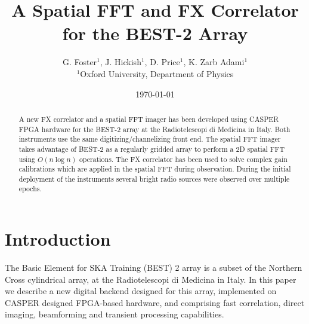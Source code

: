 \documentclass[useAMS,macros,usenatbib,onecolumn]{mn2e}
\title[]{A Spatial FFT and FX Correlator for the BEST-2 Array}
\author[G. Foster, J. Hickish, D. Price and K. Zarb Adami]{G. Foster$^{1}$, J. Hickish$^{1}$, D. Price$^{1}$, K. Zarb Adami$^{1}$\\
$^{1}$Oxford University, Department of Physics}
\begin{document}
\date{\today}

\pagerange{\pageref{firstpage}--\pageref{lastpage}} 

\maketitle

\begin{abstract}
A new FX correlator and a spatial FFT imager has been developed using CASPER FPGA hardware for the BEST-2 array at the Radiotelescopi di Medicina in Italy.
Both instruments use the same digitizing/channelizing front end.
The spatial FFT imager takes advantage of BEST-2 as a regularly gridded array to perform a 2D spatial FFT using $O(n \log n)$ operations.
The FX correlator has been used to solve complex gain calibrations which are applied in the spatial FFT during observation.
During the initial deployment of the instruments several bright radio sources were observed over multiple epochs.
\end{abstract}

\section{Introduction}

The Basic Element for SKA Training (BEST) 2 array is a subset of the Northern Cross cylindrical array, at the Radiotelescopi di Medicina in Italy.
In this paper we describe a new digital backend designed for this array, implemented on CASPER \citep{casper} designed FPGA-based hardware, and comprising fast correlation, direct imaging, beamforming and transient processing capabilities.
\end{document}
